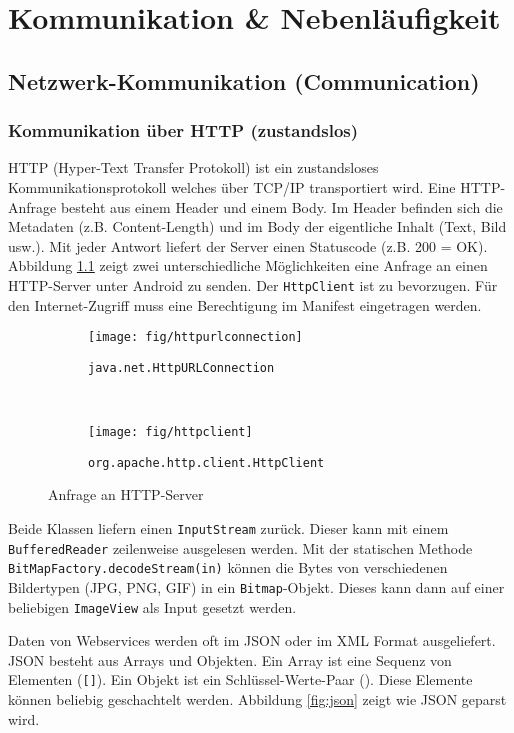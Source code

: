 \chapter{Kommunikation \& Nebenläufigkeit}

\section{Netzwerk-Kommunikation (Communication)}

\subsection{Kommunikation über HTTP (zustandslos)}

HTTP (Hyper-Text Transfer Protokoll) ist ein zustandsloses Kommunikationsprotokoll welches über TCP/IP transportiert wird. Eine HTTP-Anfrage besteht aus einem Header und einem Body. Im Header befinden sich die Metadaten (z.B. Content-Length) und im Body der eigentliche Inhalt (Text, Bild usw.). Mit jeder Antwort liefert der Server einen Statuscode (z.B. 200 = OK).
Abbildung \ref{fig:http-anfrage} zeigt zwei unterschiedliche Möglichkeiten eine Anfrage an einen HTTP-Server unter Android zu senden. Der \texttt{HttpClient} ist zu bevorzugen. Für den Internet-Zugriff muss eine Berechtigung im Manifest eingetragen werden.

\begin{figure}
	\centering
	\begin{subfigure}[b]{0.48\textwidth}
		\texttt{[image: fig/httpurlconnection]}
		\caption{\texttt{java.net.HttpURLConnection}}
	\end{subfigure}
	~
	\begin{subfigure}[b]{0.48\textwidth}
		\texttt{[image: fig/httpclient]}
		\caption{\texttt{org.apache.http.client.HttpClient}}
	\end{subfigure}
	\caption{Anfrage an HTTP-Server}
	\label{fig:http-anfrage}
\end{figure}

Beide Klassen liefern einen \texttt{InputStream} zurück. Dieser kann mit einem \texttt{BufferedReader} zeilenweise ausgelesen werden. Mit der statischen Methode \texttt{BitMapFactory.decodeStream(in)} können die Bytes von verschiedenen Bildertypen (JPG, PNG, GIF) in ein \texttt{Bitmap}-Objekt. Dieses kann dann auf einer beliebigen \texttt{ImageView} als Input gesetzt werden.

Daten von Webservices werden oft im JSON oder im XML Format ausgeliefert. JSON besteht aus Arrays und Objekten. Ein Array ist eine Sequenz von Elementen (\texttt{[]}). Ein Objekt ist ein Schlüssel-Werte-Paar (\texttt{{}}). Diese Elemente können beliebig geschachtelt werden. Abbildung \ref{fig:json} zeigt wie JSON geparst wird.

